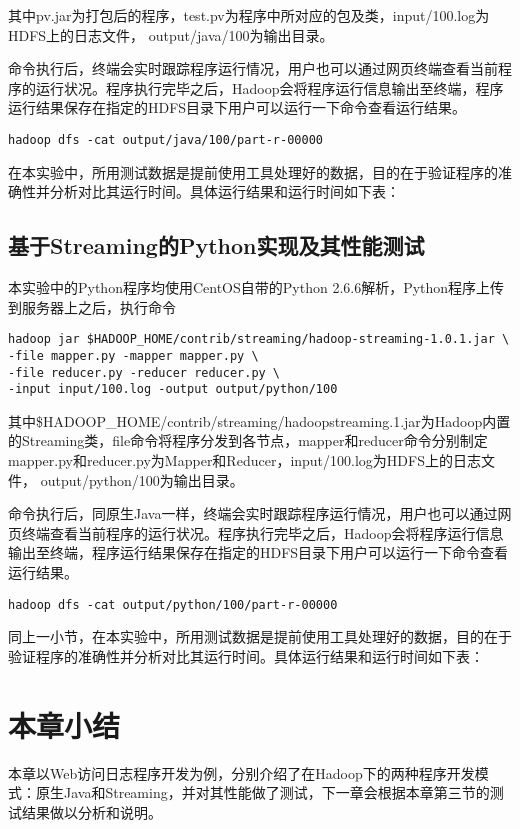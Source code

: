 其中pv.jar为打包后的程序，test.pv为程序中所对应的包及类，input/100.log为HDFS上的日志文件， output/java/100为输出目录。

命令执行后，终端会实时跟踪程序运行情况，用户也可以通过网页终端查看当前程序的运行状况。程序执行完毕之后，Hadoop会将程序运行信息输出至终端，程序运行结果保存在指定的HDFS目录下用户可以运行一下命令查看运行结果。

\begin{verbatim}
hadoop dfs -cat output/java/100/part-r-00000
\end{verbatim}

在本实验中，所用测试数据是提前使用工具处理好的数据，目的在于验证程序的准确性并分析对比其运行时间。具体运行结果和运行时间如下表：

\subsection{基于Streaming的Python实现及其性能测试}

本实验中的Python程序均使用CentOS自带的Python 2.6.6解析，Python程序上传到服务器上之后，执行命令

\begin{verbatim}
hadoop jar $HADOOP_HOME/contrib/streaming/hadoop-streaming-1.0.1.jar \
-file mapper.py -mapper mapper.py \
-file reducer.py -reducer reducer.py \
-input input/100.log -output output/python/100
\end{verbatim}

其中\$HADOOP\_HOME/contrib/streaming/hadoop\-streaming.1.jar为Hadoop内置的Streaming类，\-file命令将程序分发到各节点，\-mapper和\-reducer命令分别制定mapper.py和reducer.py为Mapper和Reducer，input/100.log为HDFS上的日志文件， output/python/100为输出目录。

命令执行后，同原生Java一样，终端会实时跟踪程序运行情况，用户也可以通过网页终端查看当前程序的运行状况。程序执行完毕之后，Hadoop会将程序运行信息输出至终端，程序运行结果保存在指定的HDFS目录下用户可以运行一下命令查看运行结果。

\begin{verbatim}
hadoop dfs -cat output/python/100/part-r-00000
\end{verbatim}

同上一小节，在本实验中，所用测试数据是提前使用工具处理好的数据，目的在于验证程序的准确性并分析对比其运行时间。具体运行结果和运行时间如下表：


\section{本章小结}
本章以Web访问日志程序开发为例，分别介绍了在Hadoop下的两种程序开发模式：原生Java和Streaming，并对其性能做了测试，下一章会根据本章第三节的测试结果做以分析和说明。